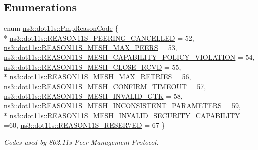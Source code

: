 \subsection*{Enumerations}
\begin{DoxyCompactItemize}
\item 
enum \hyperlink{group__dot11s_ga1132ec5975c87960ceb86ea54481aba6}{ns3\+::dot11s\+::\+Pmp\+Reason\+Code} \{ \\*
\hyperlink{group__dot11s_gga1132ec5975c87960ceb86ea54481aba6ab7a7fcea22d68ba038856480ea34fdd8}{ns3\+::dot11s\+::\+R\+E\+A\+S\+O\+N11\+S\+\_\+\+P\+E\+E\+R\+I\+N\+G\+\_\+\+C\+A\+N\+C\+E\+L\+L\+ED} = 52, 
\hyperlink{group__dot11s_gga1132ec5975c87960ceb86ea54481aba6ab70ebebb2518212636d97aa78a083169}{ns3\+::dot11s\+::\+R\+E\+A\+S\+O\+N11\+S\+\_\+\+M\+E\+S\+H\+\_\+\+M\+A\+X\+\_\+\+P\+E\+E\+RS} = 53, 
\hyperlink{group__dot11s_gga1132ec5975c87960ceb86ea54481aba6aae9441b25fc7316ae53a6e73398521e5}{ns3\+::dot11s\+::\+R\+E\+A\+S\+O\+N11\+S\+\_\+\+M\+E\+S\+H\+\_\+\+C\+A\+P\+A\+B\+I\+L\+I\+T\+Y\+\_\+\+P\+O\+L\+I\+C\+Y\+\_\+\+V\+I\+O\+L\+A\+T\+I\+ON} = 54, 
\hyperlink{group__dot11s_gga1132ec5975c87960ceb86ea54481aba6a66a9d95025c42e4e00d49efa6ece82a3}{ns3\+::dot11s\+::\+R\+E\+A\+S\+O\+N11\+S\+\_\+\+M\+E\+S\+H\+\_\+\+C\+L\+O\+S\+E\+\_\+\+R\+C\+VD} = 55, 
\\*
\hyperlink{group__dot11s_gga1132ec5975c87960ceb86ea54481aba6ab4a78ee9f92e1a9644447dc6d895f317}{ns3\+::dot11s\+::\+R\+E\+A\+S\+O\+N11\+S\+\_\+\+M\+E\+S\+H\+\_\+\+M\+A\+X\+\_\+\+R\+E\+T\+R\+I\+ES} = 56, 
\hyperlink{group__dot11s_gga1132ec5975c87960ceb86ea54481aba6adb681bf7add7cb193a7e9b3e0147875c}{ns3\+::dot11s\+::\+R\+E\+A\+S\+O\+N11\+S\+\_\+\+M\+E\+S\+H\+\_\+\+C\+O\+N\+F\+I\+R\+M\+\_\+\+T\+I\+M\+E\+O\+UT} = 57, 
\hyperlink{group__dot11s_gga1132ec5975c87960ceb86ea54481aba6a992af53cebe30af98c1acc0054bb7bae}{ns3\+::dot11s\+::\+R\+E\+A\+S\+O\+N11\+S\+\_\+\+M\+E\+S\+H\+\_\+\+I\+N\+V\+A\+L\+I\+D\+\_\+\+G\+TK} = 58, 
\hyperlink{group__dot11s_gga1132ec5975c87960ceb86ea54481aba6a98ddea6f69878fdde8dba52112bdd96d}{ns3\+::dot11s\+::\+R\+E\+A\+S\+O\+N11\+S\+\_\+\+M\+E\+S\+H\+\_\+\+I\+N\+C\+O\+N\+S\+I\+S\+T\+E\+N\+T\+\_\+\+P\+A\+R\+A\+M\+E\+T\+E\+RS} = 59, 
\\*
\hyperlink{group__dot11s_gga1132ec5975c87960ceb86ea54481aba6aab89215a9518c367d4998f025fffa630}{ns3\+::dot11s\+::\+R\+E\+A\+S\+O\+N11\+S\+\_\+\+M\+E\+S\+H\+\_\+\+I\+N\+V\+A\+L\+I\+D\+\_\+\+S\+E\+C\+U\+R\+I\+T\+Y\+\_\+\+C\+A\+P\+A\+B\+I\+L\+I\+TY} =60, 
\hyperlink{group__dot11s_gga1132ec5975c87960ceb86ea54481aba6a1e76395872503ccadd9cf008e325b3d8}{ns3\+::dot11s\+::\+R\+E\+A\+S\+O\+N11\+S\+\_\+\+R\+E\+S\+E\+R\+V\+ED} = 67
 \}\begin{DoxyCompactList}\small\item\em Codes used by 802.\+11s Peer Management Protocol. \end{DoxyCompactList}
\end{DoxyCompactItemize}
